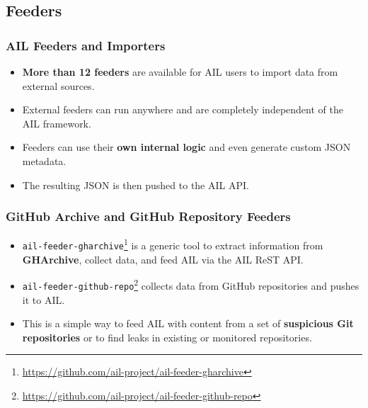 \documentclass[10pt,aspectratio=169, colorlinks=true, linkcolor=circlBlue]{beamer}
\begin{document}
\subsection{Feeders}


\begin{frame}[fragile]
    \frametitle{AIL Feeders and Importers}
    \begin{itemize}
        \item {\bf More than 12 feeders} are available for AIL users to import data from external sources.
        \item External feeders can run anywhere and are completely independent of the AIL framework.
        \item Feeders can use their {\bf own internal logic} and even generate custom JSON metadata.
        \item The resulting JSON is then pushed to the AIL API.
    \end{itemize}
\end{frame}

\begin{frame}[fragile]
    \frametitle{GitHub Archive and GitHub Repository Feeders}
    \begin{itemize}
        \item \texttt{ail-feeder-gharchive}\footnote{\url{https://github.com/ail-project/ail-feeder-gharchive}} is a generic tool to extract information from {\bf GHArchive}, collect data, and feed AIL via the AIL ReST API.
        
        \item \texttt{ail-feeder-github-repo}\footnote{\url{https://github.com/ail-project/ail-feeder-github-repo}} collects data from GitHub repositories and pushes it to AIL.
        
        \item This is a simple way to feed AIL with content from a set of {\bf suspicious Git repositories} or to find leaks in existing or monitored repositories.
    \end{itemize}
\end{frame}
\end{document}
